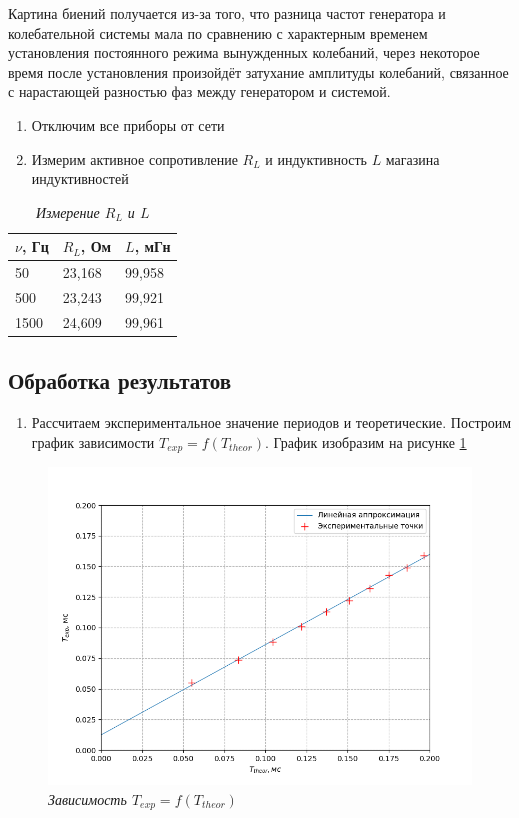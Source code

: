 \documentclass[a4paper,12pt]{article}
\begin{document}
Картина биений получается из-за того, что разница частот генератора и колебательной системы мала по сравнению с характерным временем установления постоянного режима вынужденных колебаний, через некоторое время после установления произойдёт затухание амплитуды колебаний, связанное с нарастающей разностью фаз между генератором и системой.

\begin{enumerate}[resume]
    \item Отключим все приборы от сети
    \item Измерим активное сопротивление $R_L$ и индуктивность $L$ магазина индуктивностей
\end{enumerate}

\begin{table}[]
    \centering
    \begin{tabular}{|l|l|l|}
    \hline
        $\nu$, Гц & $R_L$, Ом & $L$, мГн \\ \hline
        50 & 23,168 & 99,958 \\ \hline
        500 & 23,243 & 99,921 \\ \hline
        1500 & 24,609 & 99,961 \\ \hline
    \end{tabular}
    \caption{\textit{Измерение $R_L$ и $L$}}\label{table:7}
\end{table}

\FloatBarrier

\subsection{Обработка результатов}

\begin{enumerate}
    \item Рассчитаем экспериментальное значение периодов и теоретические. Построим график зависимости $T_{exp} = f(T_{theor})$. График изобразим на рисунке \ref{graph:1}
\end{enumerate}


\begin{figure}[!ht]
        \centering
	\includegraphics[width=1.0\textwidth]{graph-1.png}
	\caption{\textit{Зависимость $T_{exp} = f(T_{theor})$}}
	\label{graph:1}
\end{figure}
\end{document}

